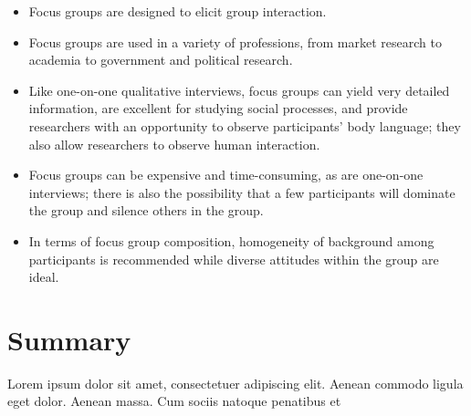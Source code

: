 \begin{itemize}
	\setlength{\itemsep}{0pt}
	\setlength{\parskip}{0pt}
	\setlength{\parsep}{0pt}
	
	\item Focus groups are designed to elicit group interaction.
	\item Focus groups are used in a variety of professions, from market research to academia to government and political research.
	\item Like one-on-one qualitative interviews, focus groups can yield very detailed information, are excellent for studying social processes, and provide researchers with an opportunity to observe participants’ body language; they also allow researchers to observe human interaction.
	\item Focus groups can be expensive and time-consuming, as are one-on-one interviews; there is also the possibility that a few participants will dominate the group and silence others in the group.
	\item In terms of focus group composition, homogeneity of background among participants is recommended while diverse attitudes within the group are ideal.
	
\end{itemize}












\section{Summary}\label{ch09:summary}

Lorem ipsum dolor sit amet, consectetuer adipiscing elit. Aenean commodo ligula eget dolor. Aenean massa. Cum sociis natoque penatibus et
